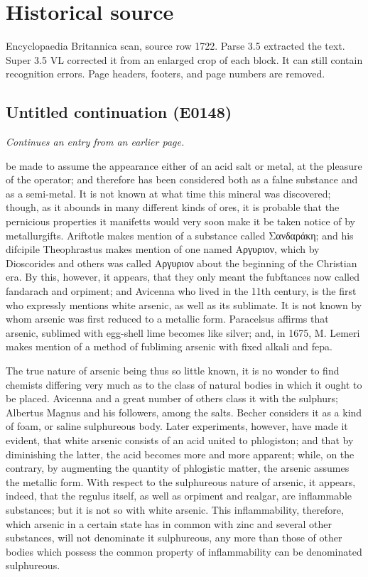 \documentclass{article}
\begin{document}
\section*{Historical source}
Encyclopaedia Britannica scan, source row 1722. Parse 3.5 extracted the text. Super 3.5 VL corrected it from an enlarged crop of each block. It can still contain recognition errors.
Page headers, footers, and page numbers are removed.

\subsection*{Untitled continuation (E0148)}
\textit{Continues an entry from an earlier page.}

be made to assume the appearance either of an acid salt or metal, at the pleasure of the operator; and therefore has been considered both as a falne substance and as a semi-metal. It is not known at what time this mineral was discovered; though, as it abounds in many different kinds of ores, it is probable that the pernicious properties it manifetts would very soon make it be taken notice of by metallurgifts. Ariftotle makes mention of a substance called Σανδαράκη; and his difcipile Theophrastus makes mention of one named Αργυριον, which by Dioscorides and others was called Αργυριον about the beginning of the Christian era. By this, however, it appears, that they only meant the fubftances now called fandarach and orpiment; and Avicenna who lived in the 11th century, is the first who expressly mentions white arsenic, as well as its sublimate. It is not known by whom arsenic was first reduced to a metallic form. Paracelsus affirms that arsenic, sublimed with egg-shell lime becomes like silver; and, in 1675, M. Lemeri makes mention of a method of fubliming arsenic with fixed alkali and fepa.

The true nature of arsenic being thus so little known, it is no wonder to find chemists differing very much as to the class of natural bodies in which it ought to be placed. Avicenna and a great number of others class it with the sulphurs; Albertus Magnus and his followers, among the salts. Becher considers it as a kind of foam, or saline sulphureous body. Later experiments, however, have made it evident, that white arsenic consists of an acid united to phlogiston; and that by diminishing the latter, the acid becomes more and more apparent; while, on the contrary, by augmenting the quantity of phlogistic matter, the arsenic assumes the metallic form. With respect to the sulphureous nature of arsenic, it appears, indeed, that the regulus itself, as well as orpiment and realgar, are inflammable substances; but it is not so with white arsenic. This inflammability, therefore, which arsenic in a certain state has in common with zinc and several other substances, will not denominate it sulphureous, any more than those of other bodies which possess the common property of inflammability can be denominated sulphureous.
\end{document}
